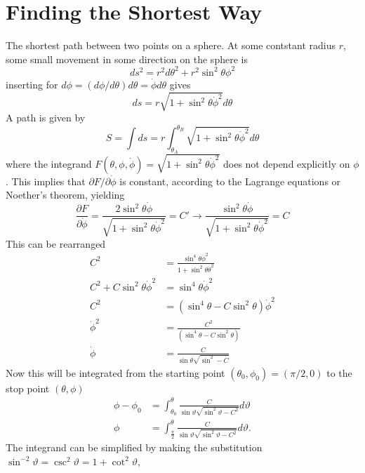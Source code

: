 \documentclass[11pt]{amsart}
\begin{document}
\section{Finding the Shortest Way}
The shortest path between two points on a sphere. At some contstant radius $r$, some small movement in some direction on the sphere is
\begin{equation}
ds^2 = r^2d\theta^2 + r^2\sin^2\theta\phi^2 
\end{equation}
inserting for $d\phi = (d\phi/d\theta)d\theta = \dot{\phi}d\theta$ gives
\begin{equation}
ds = r\sqrt{1 +\sin^2\theta\dot{\phi}^2}d\theta
\end{equation}
A path is given by
\begin{equation}
S = \int ds = r \int_{\theta_A}^{\theta_B} \sqrt{1 + \sin^2\theta\dot{\phi}^2}d\theta
\end{equation}
where the integrand $F(\theta, \phi, \dot{\phi}) = \sqrt{1 + \sin^2\theta\dot{\phi}^2}$ does not depend explicitly on $\phi$. This implies that $\partial F/ \partial \dot{\phi}$ is constant, according to the Lagrange equations or Noether's theorem, yielding
\begin{equation}
\frac{\partial F}{\partial \dot{\phi}} = \frac{2\sin^2\theta\dot{\phi}}{\sqrt{1 + \sin^2\theta\dot{\phi}^2}} = C' \rightarrow \frac{\sin^2\theta\dot{\phi}}{\sqrt{1 + \sin^2\theta\dot{\phi}^2}} = C  
\end{equation}
This can be rearranged
\begin{align*}
C^2 &= \frac{\sin^4\theta\dot{\phi}^2}{1 + \sin^2\theta\dot{\theta}^2} \\
C^2 + C\sin^2\theta\dot{\phi}^2 &= \sin^4\theta\dot{\phi}^2 \\
C^2 &= (\sin^4\theta - C\sin^2\theta)\dot{\phi}^2 \\
\dot{\phi}^2 &= \frac{C^2}{(\sin^4\theta - C\sin^2\theta)} \\
\dot{\phi} &= \frac{C}{\sin\theta\sqrt{\sin^2 - C}}
\end{align*}
Now this will be integrated from the starting point $(\theta_0, \phi_0) = (\pi/2,0)$ to the stop point $(\theta,\phi)$
\begin{align*}
\phi - \phi_0 &= \int_{\theta_0}^{\theta} \frac{C}{\sin\vartheta\sqrt{\sin^2\vartheta-C^2}}d\vartheta \\
\phi &= \int_{\frac{\pi}{2}}^{\theta} \frac{C}{\sin\vartheta\sqrt{\sin^2\vartheta-C^2}}d\vartheta.
\end{align*}
The integrand can be simplified by making the substitution $\sin^{-2}\vartheta = \csc^2\vartheta = 1 + \cot^2\vartheta$,
\end{document}
